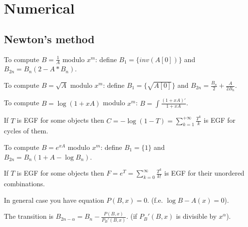 \chapter{Numerical}
\section{Newton's method}
	To compute $B = \frac{1}{A}$ modulo $x^m$: define $B_1 = \{inv(A[0])\}$ and $B_{2n} = B_n (2 - A * B_n)$.


	To compute $B = \sqrt{A}$ modulo $x^m$: define $B_1 = \{\sqrt{A[0]}\}$ and $B_{2n} = \frac{B_n}{2} + \frac{A}{2B_n}$.


	To compute $B = \log (1 + xA)$ modulo $x^m$: $B = \int\frac{(1 + xA)'}{1 + xA}$.

	If $T$ is EGF for some objects then $C = -\log (1 - T) = \sum_{k = 1}^{+\infty} \frac{T^k}{k}$ is EGF for cycles of them.


	To compute $B = e^{xA}$ modulo $x^m$: define $B_1 = \{1\}$ and $B_{2n} = B_n(1 + A - \log B_n)$.

	If $T$ is EGF for some objects then $F = e^T = \sum_{k = 0}^{\infty} \frac{T^k}{k!}$ is EGF for their unordered combinations.

	In general case you have equation $P(B, x) = 0$. (f.e. $\log B - A(x) = 0$).

	The transition is $B_{2n - \alpha} = B_n - \frac{P(B, x)}{P_B'(B, x)}$. (if $P_B'(B, x)$ is divisible by $x^\alpha$).



